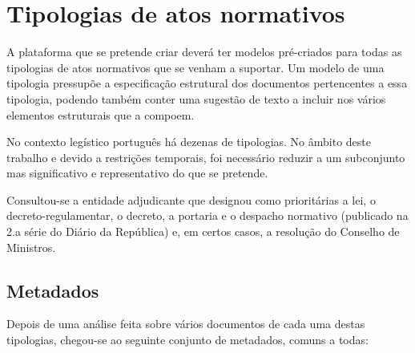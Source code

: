 \chapter{Tipologias de atos normativos}
\label{tipologias}

A plataforma que se pretende criar deverá ter modelos pré-criados para todas as tipologias de atos normativos 
que se venham a suportar. 
Um modelo de uma tipologia pressupõe a especificação estrutural dos documentos pertencentes a essa tipologia, 
podendo também conter uma sugestão de texto a incluir nos vários elementos estruturais que a compoem.

No contexto legístico português há dezenas de tipologias. No âmbito deste trabalho e devido a 
restrições temporais, foi necessário reduzir a um subconjunto mas significativo e representativo do que se pretende.

Consultou-se a entidade adjudicante que designou como prioritárias a lei, o decreto-regulamentar, o decreto, 
a portaria e o despacho normativo 
(publicado na 2.a série do Diário da República) e, em certos casos, a resolução do Conselho de Ministros.

\section{Metadados}

Depois de uma análise feita sobre vários documentos de cada uma destas tipologias, chegou-se ao seguinte conjunto
de metadados, comuns a todas:

